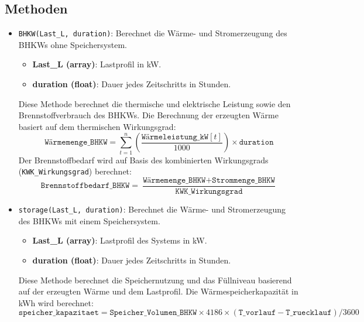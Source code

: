 \subsection{Methoden}
\begin{itemize}
    \item \texttt{BHKW(Last\_L, duration)}: Berechnet die Wärme- und Stromerzeugung des BHKWs ohne Speichersystem.
    \begin{itemize}
        \item \textbf{Last\_L (array)}: Lastprofil in kW.
        \item \textbf{duration (float)}: Dauer jedes Zeitschritts in Stunden.
    \end{itemize}
    Diese Methode berechnet die thermische und elektrische Leistung sowie den Brennstoffverbrauch des BHKWs. Die Berechnung der erzeugten Wärme basiert auf dem thermischen Wirkungsgrad:
    \[
    \texttt{Wärmemenge\_BHKW} = \sum_{t=1}^{n} \left( \frac{\texttt{Wärmeleistung\_kW}[t]}{1000} \right) \times \texttt{duration}
    \]
    Der Brennstoffbedarf wird auf Basis des kombinierten Wirkungsgrads (\texttt{KWK\_Wirkungsgrad}) berechnet:
    \[
    \texttt{Brennstoffbedarf\_BHKW} = \frac{\texttt{Wärmemenge\_BHKW} + \texttt{Strommenge\_BHKW}}{\texttt{KWK\_Wirkungsgrad}}
    \]

    \item \texttt{storage(Last\_L, duration)}: Berechnet die Wärme- und Stromerzeugung des BHKWs mit einem Speichersystem.
    \begin{itemize}
        \item \textbf{Last\_L (array)}: Lastprofil des Systems in kW.
        \item \textbf{duration (float)}: Dauer jedes Zeitschritts in Stunden.
    \end{itemize}
    Diese Methode berechnet die Speichernutzung und das Füllniveau basierend auf der erzeugten Wärme und dem Lastprofil. Die Wärmespeicherkapazität in kWh wird berechnet:
    \[
    \texttt{speicher\_kapazitaet} = \texttt{Speicher\_Volumen\_BHKW} \times 4186 \times (\texttt{T\_vorlauf} - \texttt{T\_ruecklauf}) / 3600
    \]
    

\end{itemize}
